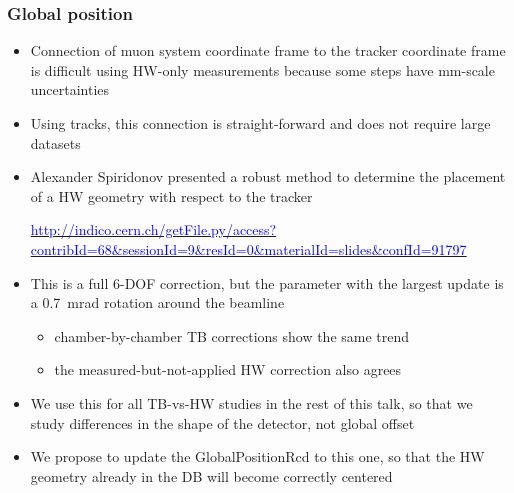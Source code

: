 \documentclass[compress]{beamer}
\begin{document}
\begin{frame}
\frametitle{Global position}
\begin{itemize}
\item Connection of muon system coordinate frame to the tracker coordinate frame is difficult using HW-only measurements because some steps have mm-scale uncertainties
\item Using tracks, this connection is straight-forward and does not require large datasets
\item Alexander Spiridonov presented a robust method to determine the placement of a HW geometry with respect to the tracker

\href{http://indico.cern.ch/getFile.py/access?contribId=68&sessionId=9&resId=0&materialId=slides&confId=91797}{\tiny \textcolor{blue}{http://indico.cern.ch/getFile.py/access?contribId=68\&sessionId=9\&resId=0\&materialId=slides\&confId=91797}}

\item This is a full 6-DOF correction, but the parameter with the largest update is a 0.7~mrad rotation around the beamline
\begin{itemize}
\item chamber-by-chamber TB corrections show the same trend
\item the measured-but-not-applied HW correction also agrees
\end{itemize}

\item We use this for all TB-vs-HW studies in the rest of this talk,
  so that we study differences in the shape of the detector, not global offset

\item We propose to update the GlobalPositionRcd to this one, so that the HW geometry already in the DB will become correctly centered
\end{itemize}
\end{frame}
\end{document}
